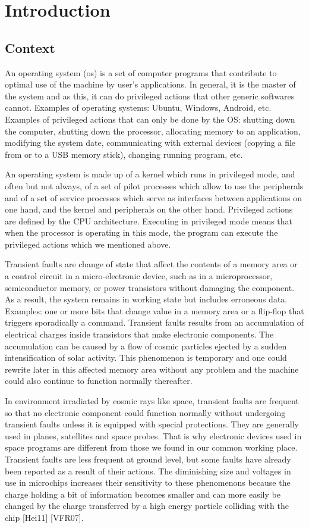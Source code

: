 \addchapheadtotoc
\chapter{Introduction}
\section{Context}
An operating system (\acrshort {os}) is a set of computer programs that contribute to optimal use of the machine by user's applications. In general, it is the master of the system and as this, it can do privileged actions that other generic softwares cannot. Examples of operating systems: Ubuntu, Windows, Android, etc. Examples of privileged actions that can only be done by the OS: shutting down the computer, shutting down the processor, allocating memory to an application, modifying the system date, communicating with external devices (copying a file from or to a USB memory stick), changing running program, etc.

An operating system is made up of a kernel which runs in privileged mode, and often but not always, of a set of pilot processes which allow to use the peripherals and of a set of service processes which serve as interfaces between applications on one hand, and the kernel and peripherals on the other hand. Privileged actions are defined by the CPU architecture. Executing in privileged mode means that when the processor is operating in this mode, the program can execute the privileged actions which we mentioned above.

Transient faults are change of state that affect the contents of a memory area or a control circuit in a micro-electronic device, such as in a microprocessor, semiconductor memory, or power transistors without damaging the component. As a result, the system remains in working state but includes erroneous data. Examples: one or more bits that change value in a memory area or a flip-flop that triggers sporadically a command. Transient faults results from an accumulation of electrical charges inside transistors that make electronic components. The accumulation can be caused by a flow of cosmic particles ejected by a sudden intensification of solar activity. This phenomenon is temporary and one could rewrite later in this affected memory area without any problem and the machine could also continue to function normally thereafter.

In environment irradiated by cosmic rays like space, transient faults are frequent so that no electronic component could function normally without undergoing transient faults unless it is equipped with special protections. They are generally used in planes, satellites and space probes. That is why electronic devices used in space programs are different from those we found in our common working place. Transient faults are less frequent at ground level, but some faults have already been reported as a result of their actions. The diminishing size and voltages in use in microchips increases their sensitivity to these phenomenons because the charge holding a bit of information becomes smaller and can more easily be changed by the charge transferred by a high energy particle colliding with the chip [Hei11] [VFR07]. 

